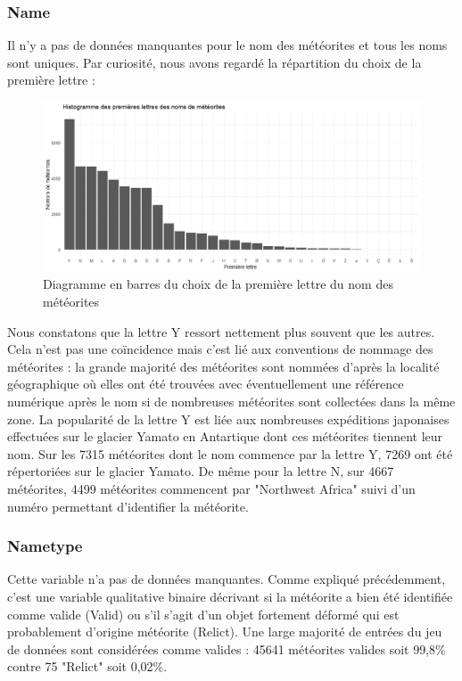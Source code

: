 \documentclass[12pt]{article}
\begin{document}
\subsubsection*{Name}
Il n'y a pas de données manquantes pour le nom des météorites et tous les noms sont uniques. Par curiosité, nous avons regardé la répartition du choix de la première lettre :
\begin{figure}[H]
\centering
\includegraphics[width=16cm]{Images/exploration/name_barplot_lettres.png}
\caption{Diagramme en barres du choix de la première lettre du nom des météorites}
\end{figure}
Nous constatons que la lettre Y ressort nettement plus souvent que les autres. Cela n'est pas une coïncidence mais c'est lié aux conventions de nommage des météorites \cite{Convention_nommage_meteorites} : la grande majorité des météorites sont nommées d'après la localité géographique où elles ont été trouvées avec éventuellement une référence numérique après le nom si de nombreuses météorites sont collectées dans la même zone. La popularité de la lettre Y est liée aux nombreuses expéditions japonaises effectuées sur le glacier Yamato en Antartique dont ces météorites tiennent leur nom. Sur les 7315 météorites dont le nom commence par la lettre Y, 7269 ont été répertoriées sur le glacier Yamato. De même pour la lettre N, sur 4667 météorites, 4499 météorites commencent par "Northwest Africa" suivi d'un numéro permettant d'identifier la météorite.
\subsubsection*{Nametype}
Cette variable n'a pas de données manquantes. Comme expliqué précédemment, c'est une variable qualitative binaire décrivant si la météorite a bien été identifiée comme valide (Valid) ou s'il s'agit d'un objet fortement déformé qui est probablement d'origine météorite (Relict). Une large majorité de entrées du jeu de données sont considérées comme valides : 45641 météorites valides soit 99,8\% contre 75 "Relict" soit 0,02\%.
\end{document}
